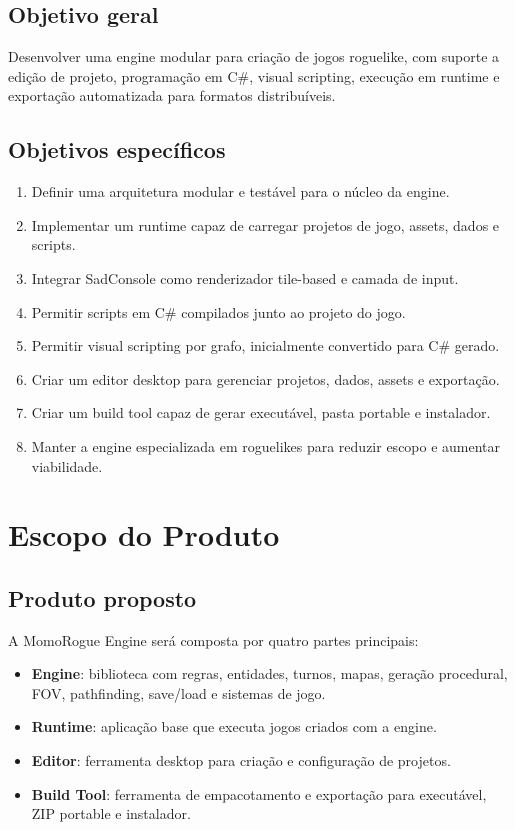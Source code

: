 \documentclass[12pt,a4paper]{article}
\begin{document}
\subsection{Objetivo geral}

Desenvolver uma engine modular para criação de jogos roguelike, com suporte a edição de projeto, programação em C\#, visual scripting, execução em runtime e exportação automatizada para formatos distribuíveis.

\subsection{Objetivos específicos}

\begin{enumerate}[label=\alph*)]
    \item Definir uma arquitetura modular e testável para o núcleo da engine.
    \item Implementar um runtime capaz de carregar projetos de jogo, assets, dados e scripts.
    \item Integrar SadConsole como renderizador tile-based e camada de input.
    \item Permitir scripts em C\# compilados junto ao projeto do jogo.
    \item Permitir visual scripting por grafo, inicialmente convertido para C\# gerado.
    \item Criar um editor desktop para gerenciar projetos, dados, assets e exportação.
    \item Criar um build tool capaz de gerar executável, pasta portable e instalador.
    \item Manter a engine especializada em roguelikes para reduzir escopo e aumentar viabilidade.
\end{enumerate}

\section{Escopo do Produto}

\subsection{Produto proposto}

A MomoRogue Engine será composta por quatro partes principais:

\begin{itemize}
    \item \textbf{Engine}: biblioteca com regras, entidades, turnos, mapas, geração procedural, FOV, pathfinding, save/load e sistemas de jogo.
    \item \textbf{Runtime}: aplicação base que executa jogos criados com a engine.
    \item \textbf{Editor}: ferramenta desktop para criação e configuração de projetos.
    \item \textbf{Build Tool}: ferramenta de empacotamento e exportação para executável, ZIP portable e instalador.
\end{itemize}
\end{document}
